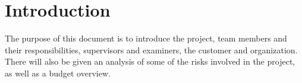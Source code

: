 \section{Introduction}

The purpose of this document is to introduce the project, team members and their responsibilities, supervisors and examiners, the customer and organization. There will also be given an analysis of some of the risks involved in the project, as well as a budget overview.  
\\\\